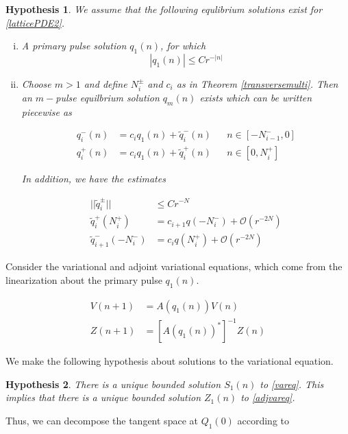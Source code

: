 \documentclass[12pt]{article}
\newtheorem{hypothesis}{Hypothesis}
\begin{document}
\begin{hypothesis}\label{solutionshyp}
We assume that the following equlibrium solutions exist for \eqref{latticePDE2}.
\begin{enumerate}[(i)]
\item A primary pulse solution $q_1(n)$, for which 
\begin{equation}
|q_1(n)| \leq C r^{-|n|}
\end{equation}
\item Choose $m > 1$ and define $N_i^\pm$ and $c_i$ as in Theorem \ref{transversemulti}. Then an $m-$pulse equilbrium solution $q_m(n)$ exists which can be written piecewise as

\begin{align}
q_i^-(n) &= c_i q_1(n) + \tilde{q}_i^-(n) && n \in [-N_{i-1}^-, 0] \\
q_i^+(n) &= c_i q_1(n) + \tilde{q}_i^+(n) && n \in [0, N_i^+]
\end{align}

In addition, we have the estimates

\begin{align}
||\tilde{q}_i^\pm|| &\leq C r^{-N} \\
\tilde{q}_i^+(N_i^+) &= c_{i+1} q(-N_i^-) + \mathcal{O}(r^{-2N}) \\
\tilde{q}_{i+1}^-(-N_i^-) &= c_i q(N_i^+) + \mathcal{O}(r^{-2N})
\end{align}
\end{enumerate}
\end{hypothesis}

Consider the variational and adjoint variational equations, which come from the linearization about the primary pulse $q_1(n)$.

\begin{align}
V(n+1) &= A(q_1(n)) V(n) \label{vareq} \\
Z(n+1) &= [A(q_1(n))^*]^{-1} Z(n) \label{adjvareq}
\end{align}

We make the following hypothesis about solutions to the variational equation.

\begin{hypothesis}\label{vareqhyp}
There is a unique bounded solution $S_1(n)$ to \eqref{vareq}. This implies that there is a unique bounded solution $Z_1(n)$ to \eqref{adjvareq}.
\end{hypothesis}

Thus, we can decompose the tangent space at $Q_1(0)$ according to
\end{document}
